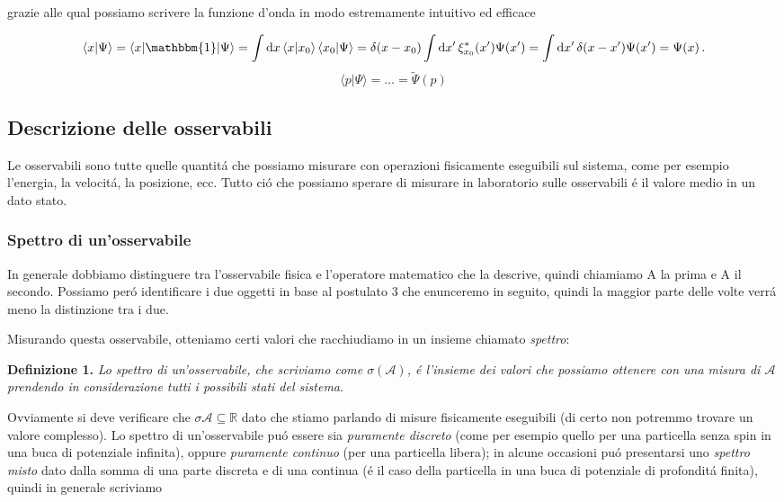 grazie alle qual possiamo scrivere la funzione d'onda in modo estremamente intuitivo ed efficace
 
$$\langle x|\Psi\rangle=\langle x|\mathbbm{1}|\Psi\rangle=\int\mathrm{d}x\,\langle x|x_{0}\rangle\,\langle x_{0}|\Psi\rangle=\delta(x-x_{0})\int\mathrm{d}x^{\prime}\,\xi_{x_{0}}^{*}(x^{\prime})\Psi(x^{\prime})=\int\mathrm{d}x^{\prime}\,\delta(x-x^{\prime})\Psi(x^{\prime})=\Psi(x)\,.$$
$$\langle p|\Psi\rangle=\ldots={\tilde{\Psi}}(p)$$

\subsection{Descrizione delle osservabili}

Le osservabili sono tutte quelle quantit\'a che possiamo misurare con operazioni fisicamente eseguibili sul sistema, come per esempio l'energia, la velocit\'a, la posizione, ecc. Tutto ci\'o che possiamo sperare di misurare in laboratorio sulle osservabili \'e il valore medio in un dato stato.

\subsubsection{Spettro di un'osservabile}

In generale dobbiamo distinguere tra l'osservabile fisica e l'operatore matematico che la descrive, quindi chiamiamo A la prima e A il secondo. Possiamo per\'o identificare i due oggetti in base al postulato 3 che enunceremo in seguito, quindi la maggior parte delle volte verr\'a meno la distinzione tra i due.

Misurando questa osservabile, otteniamo certi valori che racchiudiamo in un insieme chiamato \textit{spettro}:

\textbf{Definizione 1.} \textit{Lo spettro di un'osservabile, che scriviamo come $\sigma(\mathcal{A})$, \'e l'insieme dei valori che possiamo ottenere con una misura di $\mathcal{A}$ prendendo in considerazione tutti i possibili stati del sistema}.

Ovviamente si deve verificare che $\sigma \mathcal{A} \subseteq \mathbb{R}$ dato che stiamo parlando di misure fisicamente eseguibili (di certo non potremmo trovare un valore complesso). Lo spettro di un'osservabile pu\'o essere sia \textit{puramente discreto} (come per esempio quello per una particella senza spin in una buca di potenziale infinita), oppure \textit{puramente continuo} (per una particella libera); in alcune occasioni pu\'o presentarsi uno \textit{spettro misto} dato dalla somma di una parte discreta e di una continua (\'e il caso della particella in una buca di potenziale di profondit\'a finita),
quindi in generale scriviamo 

